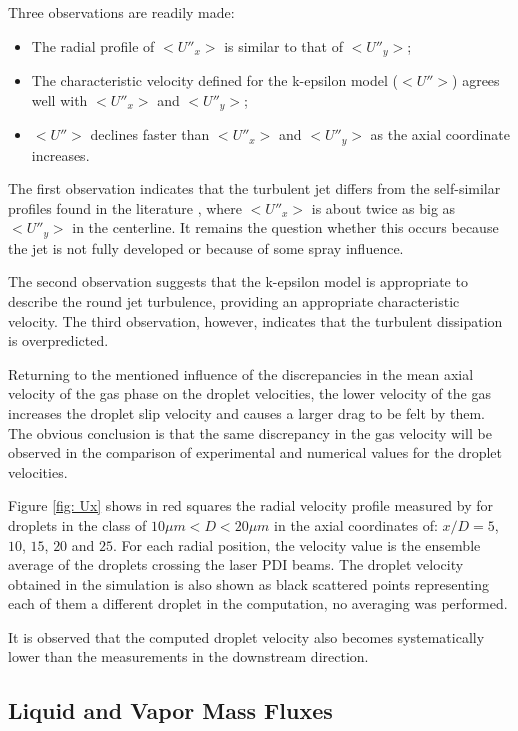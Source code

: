 \documentclass[preprint,12pt,review]{elsarticle}
\begin{document}
Three observations are readily made:  
\begin{itemize}
  \item The radial profile of $<U''_x>$ is similar to that of $<U''_y>$;
  \item The characteristic velocity defined for the k-epsilon model ($<U''>$) agrees well with $<U''_x>$ and $<U''_y>$;
 \item $<U''>$ declines faster than $<U''_x>$ and $<U''_y>$ as the axial coordinate increases.
\end{itemize}

The first observation indicates that the turbulent jet differs from the self-similar profiles found in the literature \citet{pope2000turbulent}, where $<U''_x>$ is about twice as big as $<U''_y>$ in the centerline. It remains the question whether this occurs because the jet is not fully developed or because of some spray influence.

The second observation suggests that the k-epsilon model is appropriate to describe the round jet turbulence, providing an appropriate characteristic velocity. The third observation, however, indicates that the turbulent dissipation is overpredicted.

Returning to the mentioned influence of the discrepancies in the mean axial velocity of the gas phase on the droplet velocities, the lower velocity of the gas increases the droplet slip velocity and causes a larger drag to be felt by them. The obvious conclusion is that the same discrepancy in the gas velocity will be observed in the comparison of experimental and numerical values for the droplet velocities.

Figure \ref{fig: Ux} shows in red squares the radial velocity profile measured  by \citet{chen} for droplets in the class of $10\mu m <D<20\mu m$ in the axial coordinates of: $x/D=5$, $10$, $15$, $20$ and $25$.  For each radial position, the velocity value is the ensemble average of the droplets crossing the laser PDI beams. The droplet velocity obtained in the simulation is also shown as black scattered points representing each of them a different droplet in the computation, no averaging was performed.

It is observed that the computed droplet velocity also becomes systematically lower than the measurements in the downstream direction.

\subsection{Liquid and Vapor Mass Fluxes}
\end{document}
